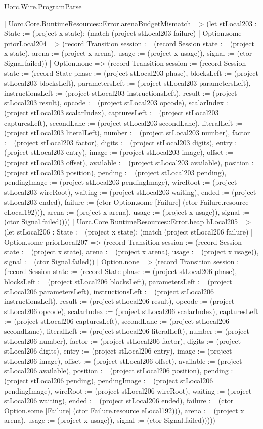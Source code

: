 \begin{lexlean}{Uorc.Wire.ProgramParse}
\begin{semanticmodule}
{      | Uorc.Core.RuntimeResources::Error.arenaBudgetMismatch => (let stLocal203 : State := (project x state); (match (project stLocal203 failure)
        | Option.some priorLocal204 => (record Transition {session := (record Session {state := (project x state), arena := (project x arena), usage := (project x usage)}), signal := (ctor Signal.failed)})
        | Option.none => (record Transition {session := (record Session {state := (record State {phase := (project stLocal203 phase), blocksLeft := (project stLocal203 blocksLeft), parametersLeft := (project stLocal203 parametersLeft), instructionsLeft := (project stLocal203 instructionsLeft), result := (project stLocal203 result), opcode := (project stLocal203 opcode), scalarIndex := (project stLocal203 scalarIndex), capturesLeft := (project stLocal203 capturesLeft), secondLane := (project stLocal203 secondLane), literalLeft := (project stLocal203 literalLeft), number := (project stLocal203 number), factor := (project stLocal203 factor), digits := (project stLocal203 digits), entry := (project stLocal203 entry), image := (project stLocal203 image), offset := (project stLocal203 offset), available := (project stLocal203 available), position := (project stLocal203 position), pending := (project stLocal203 pending), pendingImage := (project stLocal203 pendingImage), wireRoot := (project stLocal203 wireRoot), waiting := (project stLocal203 waiting), ended := (project stLocal203 ended), failure := (ctor Option.some [Failure] (ctor Failure.resource eLocal192))}), arena := (project x arena), usage := (project x usage)}), signal := (ctor Signal.failed)})))
      | Uorc.Core.RuntimeResources::Error.heap hLocal205 => (let stLocal206 : State := (project x state); (match (project stLocal206 failure)
        | Option.some priorLocal207 => (record Transition {session := (record Session {state := (project x state), arena := (project x arena), usage := (project x usage)}), signal := (ctor Signal.failed)})
        | Option.none => (record Transition {session := (record Session {state := (record State {phase := (project stLocal206 phase), blocksLeft := (project stLocal206 blocksLeft), parametersLeft := (project stLocal206 parametersLeft), instructionsLeft := (project stLocal206 instructionsLeft), result := (project stLocal206 result), opcode := (project stLocal206 opcode), scalarIndex := (project stLocal206 scalarIndex), capturesLeft := (project stLocal206 capturesLeft), secondLane := (project stLocal206 secondLane), literalLeft := (project stLocal206 literalLeft), number := (project stLocal206 number), factor := (project stLocal206 factor), digits := (project stLocal206 digits), entry := (project stLocal206 entry), image := (project stLocal206 image), offset := (project stLocal206 offset), available := (project stLocal206 available), position := (project stLocal206 position), pending := (project stLocal206 pending), pendingImage := (project stLocal206 pendingImage), wireRoot := (project stLocal206 wireRoot), waiting := (project stLocal206 waiting), ended := (project stLocal206 ended), failure := (ctor Option.some [Failure] (ctor Failure.resource eLocal192))}), arena := (project x arena), usage := (project x usage)}), signal := (ctor Signal.failed)}))))
}
\end{semanticmodule}
\end{lexlean}
